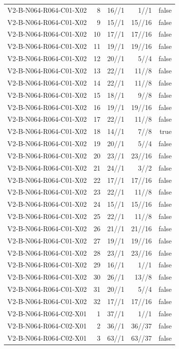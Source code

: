 {\begin{longtable}{lrrrr}
V2-B-N064-R064-C01-X02 & 8 & 16//1 & 1//1 & false \\
V2-B-N064-R064-C01-X02 & 9 & 15//1 & 15//16 & false \\
V2-B-N064-R064-C01-X02 & 10 & 17//1 & 17//16 & false \\
V2-B-N064-R064-C01-X02 & 11 & 19//1 & 19//16 & false \\
V2-B-N064-R064-C01-X02 & 12 & 20//1 & 5//4 & false \\
V2-B-N064-R064-C01-X02 & 13 & 22//1 & 11//8 & false \\
V2-B-N064-R064-C01-X02 & 14 & 22//1 & 11//8 & false \\
V2-B-N064-R064-C01-X02 & 15 & 18//1 & 9//8 & false \\
V2-B-N064-R064-C01-X02 & 16 & 19//1 & 19//16 & false \\
V2-B-N064-R064-C01-X02 & 17 & 22//1 & 11//8 & false \\
V2-B-N064-R064-C01-X02 & 18 & 14//1 & 7//8 & true \\
V2-B-N064-R064-C01-X02 & 19 & 20//1 & 5//4 & false \\
V2-B-N064-R064-C01-X02 & 20 & 23//1 & 23//16 & false \\
V2-B-N064-R064-C01-X02 & 21 & 24//1 & 3//2 & false \\
V2-B-N064-R064-C01-X02 & 22 & 17//1 & 17//16 & false \\
V2-B-N064-R064-C01-X02 & 23 & 22//1 & 11//8 & false \\
V2-B-N064-R064-C01-X02 & 24 & 15//1 & 15//16 & false \\
V2-B-N064-R064-C01-X02 & 25 & 22//1 & 11//8 & false \\
V2-B-N064-R064-C01-X02 & 26 & 21//1 & 21//16 & false \\
V2-B-N064-R064-C01-X02 & 27 & 19//1 & 19//16 & false \\
V2-B-N064-R064-C01-X02 & 28 & 23//1 & 23//16 & false \\
V2-B-N064-R064-C01-X02 & 29 & 16//1 & 1//1 & false \\
V2-B-N064-R064-C01-X02 & 30 & 26//1 & 13//8 & false \\
V2-B-N064-R064-C01-X02 & 31 & 20//1 & 5//4 & false \\
V2-B-N064-R064-C01-X02 & 32 & 17//1 & 17//16 & false \\
V2-B-N064-R064-C02-X01 & 1 & 37//1 & 1//1 & false \\
V2-B-N064-R064-C02-X01 & 2 & 36//1 & 36//37 & false \\
V2-B-N064-R064-C02-X01 & 3 & 63//1 & 63//37 & false \\

\end{longtable}}
